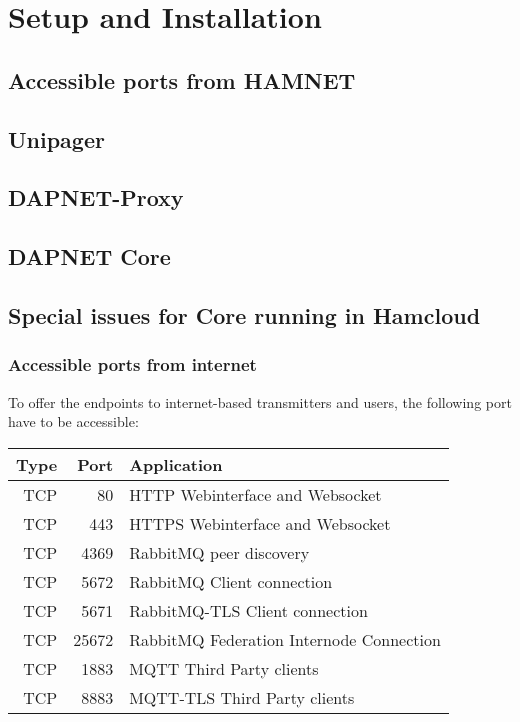 \chapter{Setup and Installation}


\section{Accessible ports from HAMNET}

\section{Unipager}

\section{DAPNET-Proxy}

\section{DAPNET Core}

\section{Special issues for Core running in Hamcloud}

\subsection{Accessible ports from internet}
To offer the endpoints to internet-based transmitters and users, the following port have to be accessible:

\begin{tabular}{r|r|l}
Type & Port & Application\\
\hline
TCP & 80 & HTTP Webinterface and Websocket\\
TCP & 443 & HTTPS Webinterface  and Websocket\\
TCP & 4369 & RabbitMQ peer discovery\\
TCP & 5672 & RabbitMQ Client connection\\
TCP & 5671 & RabbitMQ-TLS Client connection\\
TCP & 25672 & RabbitMQ Federation Internode Connection\\
TCP & 1883 & MQTT Third Party clients\\
TCP & 8883 & MQTT-TLS Third Party clients\\
\end{tabular}

